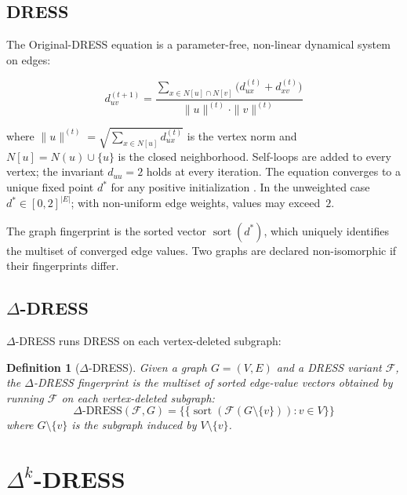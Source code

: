 \documentclass[11pt,a4paper]{article}
\newtheorem{definition}[theorem]{Definition}
\begin{document}
\subsection{DRESS}

The Original-DRESS equation \cite{castrillo2018dynamicstructuralsimilaritygraphs} is a parameter-free, non-linear dynamical system on edges:

\begin{equation}
d_{uv}^{(t+1)} = \frac{\sum_{x \in N[u] \cap N[v]} \bigl(d_{ux}^{(t)} + d_{xv}^{(t)}\bigr)}{\|u\|^{(t)} \cdot \|v\|^{(t)}}
\end{equation}

where $\|u\|^{(t)} = \sqrt{\sum_{x \in N[u]} d_{ux}^{(t)}}$ is the vertex norm and $N[u] = N(u) \cup \{u\}$ is the closed neighborhood. Self-loops are added to every vertex; the invariant $d_{uu} = 2$ holds at every iteration. The equation converges to a unique fixed point $d^*$ for any positive initialization \cite{castrillo2026dress}. In the unweighted case $d^* \in [0, 2]^{|E|}$; with non-uniform edge weights, values may exceed~$2$.

The graph fingerprint is the sorted vector $\operatorname{sort}(d^*)$, which uniquely identifies the multiset of converged edge values. Two graphs are declared non-isomorphic if their fingerprints differ.

\subsection{\texorpdfstring{$\Delta$}{Delta}-DRESS}

$\Delta$-DRESS \cite{castrillo2026dress} runs DRESS on each vertex-deleted subgraph:

\begin{definition}[$\Delta$-DRESS]
Given a graph $G = (V, E)$ and a DRESS variant $\mathcal{F}$, the $\Delta$-DRESS fingerprint is the multiset of sorted edge-value vectors obtained by running $\mathcal{F}$ on each vertex-deleted subgraph:
\[
\Delta\text{-DRESS}(\mathcal{F}, G) = \{\!\{ \operatorname{sort}(\mathcal{F}(G \setminus \{v\})) : v \in V \}\!\}
\]
where $G \setminus \{v\}$ is the subgraph induced by $V \setminus \{v\}$.
\end{definition}

\section{\texorpdfstring{$\Delta^k$}{Delta-k}-DRESS}
\end{document}
